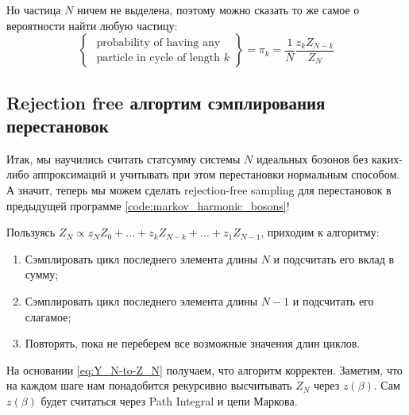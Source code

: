 Но частица $N$ ничем не выделена, поэтому можно сказать то же самое о вероятности найти любую частицу:
\begin{equation}
    \label{eq:probability-to-find-any-particle-at-cycle_k}
    \left\{\begin{array}{l}\text { probability of having any } \\ \text { particle in cycle of length } k\end{array}\right\}=\pi_{k}=\frac{1}{N} \frac{z_{k} Z_{N-k}}{Z_{N}}
\end{equation}

\subsection{Rejection free алгортим сэмплирования перестановок}

Итак, мы научились считать статсумму системы $N$ идеальных бозонов без каких-либо аппроксимаций и учитывать при этом перестановки нормальным способом.
А значит, теперь мы можем сделать rejection-free sampling для перестановок в предыдущей программе \ref{code:markov_harmonic_bosons}!

Пользуясь $Z_{N} \propto z_{N} Z_{0}+\ldots+z_{k} Z_{N-k}+\ldots+z_{1} Z_{N-1}$, приходим к алгоритму:
\begin{enumerate}
    \item Сэмплировать цикл последнего элемента длины $N$ и подсчитать его вклад в сумму;
    \item Сэмплировать цикл последнего элемента длины $N-1$ и подсчитать его слагамое;
    \item Повторять, пока не переберем все возможные значения длин циклов.
\end{enumerate}
На основании \eqref{eq:Y_N-to-Z_N} получаем, что алгоритм корректен.
Заметим, что на каждом шаге нам понадобится рекурсивно высчитывать $Z_N$ через $z(\beta)$.
Сам $z(\beta)$ будет считаться через Path Integral и цепи Маркова.

